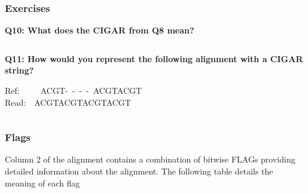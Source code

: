\documentclass[11pt]{article}
\makeatletter
\newcommand{\boxspacing}{\kern\kvtcb@left@rule\kern\kvtcb@boxsep}
\newcommand{\prompt}[4]{
        {\ttfamily\llap{{\color{blue}\LARGE\faKeyboardO\hspace{3pt}#4}}\vspace{-\baselineskip}}
    }
\makeatother
\begin{document}
\hypertarget{exercises}{%
\subsubsection{Exercises}\label{exercises}}

\textbf{Q10: What does the CIGAR from Q8 mean?}

    \begin{tcolorbox}[breakable, size=fbox, boxrule=1pt, pad at break*=1mm,colback=cellbackground, colframe=cellborder]
\prompt{In}{incolor}{ }{\boxspacing}
\begin{Verbatim}[commandchars=\\\{\}]

\end{Verbatim}
\end{tcolorbox}

    \textbf{Q11: How would you represent the following alignment with a
CIGAR string?}

Ref:~~~~~ACGT-~-~-~-~ACGTACGT\\
Read:~~ACGTACGTACGTACGT

    \begin{tcolorbox}[breakable, size=fbox, boxrule=1pt, pad at break*=1mm,colback=cellbackground, colframe=cellborder]
\prompt{In}{incolor}{ }{\boxspacing}
\begin{Verbatim}[commandchars=\\\{\}]

\end{Verbatim}
\end{tcolorbox}

    \hypertarget{flags}{%
\subsubsection{Flags}\label{flags}}

Column 2 of the alignment contains a combination of bitwise FLAGs
providing detailed information about the alignment. The following table
details the meaning of each flag
\end{document}
